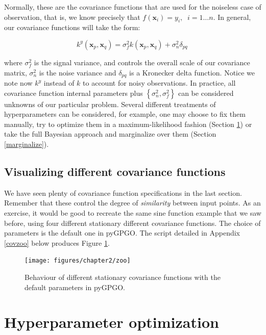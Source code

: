 \documentclass[10pt,a4paper,twoside]{book}
\begin{document}
Normally, these are the covariance functions that are used for the noiseless case of observation, that is, we know precisely that $f(\boldsymbol{x}_i) = y_i, \;\; i=1\dots n$. In general, our covariance functions will take the form:

\begin{equation}
k^y(\boldsymbol{x}_p, \boldsymbol{x}_q) = \sigma^2_f k(\boldsymbol{x}_p, \boldsymbol{x}_q) + \sigma^2_n \delta_{pq} \,
\end{equation}

where $\sigma^2_f$ is the signal variance, and controls the overall scale of our covariance matrix, $\sigma^2_n$ is the noise variance and $\delta_{pq}$ is a Kronecker delta function. Notice we note now $k^y$ instead of $k$ to account for noisy observations. In practice, all covariance function internal parameters plus $\left\lbrace\sigma_n^2, \sigma^2_f\right\rbrace$ can be considered unknowns of our particular problem. Several different treatments of hyperparameters can be considered, for example, one may choose to fix them manually, try to optimize them in a maximum-likelihood fashion (Section \ref{hyper}) or take the full Bayesian approach and marginalize over them (Section \ref{marginalize}).


\subsection{Visualizing different covariance functions}

We have seen plenty of covariance function specifications in the last section. Remember that these control the degree of \textit{similarity} between input points. As an exercise, it would be good to recreate the same sine function example that we saw before, using four different stationary different covariance functions. The choice of parameters is the default one in pyGPGO. The script detailed in Appendix \ref{covzoo} below produces Figure \ref{fig:zoo}. \\


\begin{figure}
\caption{Behaviour of different stationary covariance functions with the default parameters in pyGPGO.}
\label{fig:zoo}
\texttt{[image: figures/chapter2/zoo]}
\end{figure}

\section{Hyperparameter optimization}
\label{hyper}
\end{document}
